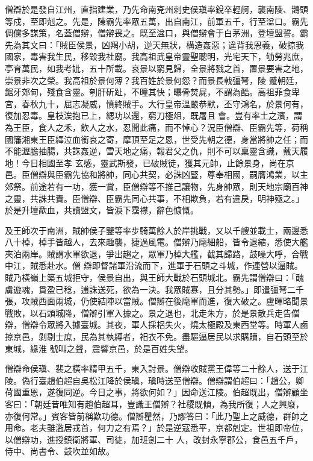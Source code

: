 \begin{pinyinscope}
 僧辯於是發自江州，直指建業，乃先命南兗州刺史侯瑱率銳卒輕舸，襲南陵、鵲頭等戍，至即剋之。先是，陳霸先率眾五萬，出自南江，前軍五千，行至湓口。霸先倜儻多謀策，名蓋僧辯，僧辯畏之。既至湓口，與僧辯會于白茅洲，登壇盟誓。霸先為其文曰：「賊臣侯景，凶羯小胡，逆天無狀，構造姦惡；違背我恩義，破掠我國家，毒害我生民，移毀我社廟。我高祖武皇帝靈聖聰明，光宅天下，劬勞兆庶，亭育萬民，如我考妣，五十所載。哀景以窮見歸，全景將戮之首，置景要害之地，崇景非次之榮。我高祖於景何薄？我百姓於景何怨？而景長戟彊弩，陵
 蹙朝廷，鋸牙郊甸，殘食含靈。刳肝斫趾，不曈其快；曝骨焚屍，不謂為酷。高祖菲食卑宮，春秋九十，屈志凝威，憤終賊手。大行皇帝溫嚴恭默，丕守鴻名，於景何有，復加忍毒。皇枝涘抱已上，緦功以還，窮刀極俎，既屠且會。豈有率土之濱，謂為王臣，食人之禾，飲人之水，忍聞此痛，而不悼心？況臣僧辯、臣霸先等，荷稱國籓湘東王臣繹泣血銜哀之寄，摩頂至足之恩，世受先朝之德，身當將帥之任；而不能瀝膽抽腸，共誅姦逆，雪天地之痛，報君父之仇，則不可以稟靈含識，戴天履地！今日相國至孝
 玄感，靈武斯發，已破賊徒，獲其元帥，止餘景身，尚在京邑。臣僧辯與臣霸先協和將帥，同心共契，必誅凶豎，尊奉相國，嗣膺鴻業，以主郊祭。前途若有一功，獲一賞，臣僧辯等不推己讓物，先身帥眾，則天地宗廟百神之靈，共誅共責。臣僧辯、臣霸先同心共事，不相欺負，若有違戾，明神殛之。」於是升壇歃血，共讀盟文，皆淚下霑襟，辭色慷慨。



 及王師次于南洲，賊帥侯子鑒等率步騎萬餘人於岸挑戰，又以千艘並載士，兩邊悉八十棹，棹手皆越人，去來趣襲，捷過風電。僧辯乃麾細船，皆令退縮，悉使大艦夾泊兩岸。賊謂水軍欲退，爭出趨之，眾軍乃棹大艦，截其歸路，鼓噪大呼，合戰中江，賊悉赴水。僧
 辯即督諸軍沿流而下，進軍于石頭之斗城，作連營以逼賊。賊乃橫嶺上築五城拒守，侯景自出，與王師大戰於石頭城北。霸先謂僧辯曰：「醜虜遊魂，貫盈已稔，逋誅送死，欲為一決。我眾賊寡，且分其勢。」即遣彊弩二千張，攻賊西面兩城，仍使結陣以當賊。僧辯在後麾軍而進，復大破之。盧暉略聞景戰敗，以石頭城降，僧辯引軍入據之。景之退也，北走朱方，於是景散兵走告僧辯，僧辯令眾將入據臺城。其夜，軍人採梠失火，燒太極殿及東西堂等。時軍人鹵掠京邑，剝剔士庶，民為其執縛者，衵衣不免。盡驅逼居民以求購贖，自石頭至於東城，緣淮
 號叫之聲，震響京邑，於是百姓失望。



 僧辯命侯瑱、裴之橫率精甲五千，東入討景。僧辯收賊黨王偉等二十餘人，送于江陵。偽行臺趙伯超自吳松江降於侯瑱，瑱時送至僧辯。僧辯謂伯超曰：「趙公，卿荷國重恩，遂復同逆。今日之事，將欲何如？」因命送江陵。伯超既出，僧辯顧坐客曰：「朝廷昔唯知有趙伯超耳，豈識王僧辯？社稷既傾，為我所復；人之興廢，亦復何常。」賓客皆前稱歎功德。僧辯瞿然，乃謬答曰：「此乃聖上之威德，群帥之用命。老夫雖濫居戎首，何力之有焉？」於是逆寇悉平，京都剋定。世祖即帝位，以僧辯功，進授鎮衛將軍、司徒，加班劍二十
 人，改封永寧郡公，食邑五千戶，侍中、尚書令、鼓吹並如故。




\end{pinyinscope}
